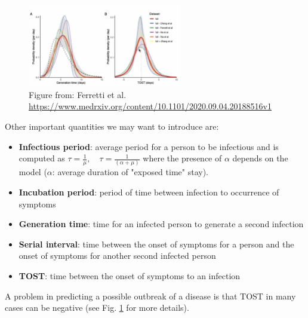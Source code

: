 \documentclass[../main/main.tex]{subfiles}
\begin{document}
\begin{figure}[h!]
\centering
\includegraphics[width=0.6\textwidth]{../lessons/image/02/4_TOST.png}
\caption{\label{fig:4_TOST} Figure from: Ferretti et al. \url{https://www.medrxiv.org/content/10.1101/2020.09.04.20188516v1}}
\end{figure}



Other important quantities we may want to introduce are:

\begin{itemize}
    \item \textbf{Infectious period}: average period for a person to be infectious and is computed as $ \tau = \frac{1}{\mu }, \quad \tau = \frac{1}{(\alpha + \mu )} $ where the presence of $\alpha$ depends on the model ($\alpha$: average duration of "exposed time" stay).
    \item \textbf{Incubation period}: period of time between infection to occurrence of symptoms
    \item \textbf{Generation time}: time for an infected person to generate a second infection
    \item \textbf{Serial interval}: time between the onset of symptoms for a person and the onset of symptoms for another second infected person
    \item \textbf{TOST}: time between the onset of symptoms to an infection
    
\end{itemize}
A problem in predicting a possible outbreak of a disease is that TOST in many cases can be negative (see Fig. \ref{fig:4_TOST} for more details).
\end{document}
